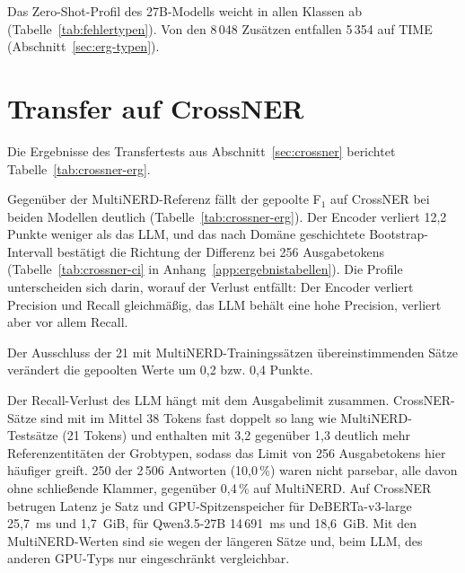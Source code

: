 Das Zero-Shot-Profil des 27B-Modells weicht in allen Klassen ab
(Tabelle~\ref{tab:fehlertypen}).
Von den 8\,048 Zusätzen entfallen 5\,354 auf TIME
(Abschnitt~\ref{sec:erg-typen}).

\section{Transfer auf CrossNER}
\label{sec:erg-crossner}

Die Ergebnisse des Transfertests aus Abschnitt~\ref{sec:crossner}
berichtet Tabelle~\ref{tab:crossner-erg}.

\begin{table}[htbp]
  \centering
  \footnotesize
  \caption[CrossNER-Transfertest (PER, ORG, LOC)]{CrossNER-Transfertest (nur PER, ORG, LOC; strikte Werte in
  Punkten; Precision und Recall als Mittel, F$_1$ als
  Mittelwert~$\pm$~Standardabweichung über die drei
  MultiNERD-Checkpoints je Modell).
  Gepoolt: Mikrowert über alle 2\,506 Sätze; Domänenmittel: ungewichtetes
  Mittel der fünf Domänen-F$_1$.
  MultiNERD-Referenz: dieselben Checkpoints auf dem MultiNERD-Testsplit,
  ebenfalls auf PER, ORG und LOC beschränkt; $\Delta$F$_1$ = gepoolter
  CrossNER-Wert minus Referenz.
  Sensitivität: gepoolter Wert ohne die 21 Sätze, die mit
  MultiNERD-Trainingssätzen übereinstimmen.}
  \label{tab:crossner-erg}
  \setlength{\tabcolsep}{3pt}
  
\end{table}

Gegenüber der MultiNERD-Referenz fällt der gepoolte F$_1$ auf CrossNER
bei beiden Modellen deutlich (Tabelle~\ref{tab:crossner-erg}).
Der Encoder verliert 12,2 Punkte weniger als das LLM, und das nach Domäne
geschichtete Bootstrap-Intervall bestätigt die Richtung der Differenz bei
256 Ausgabetokens (Tabelle~\ref{tab:crossner-ci} in
Anhang~\ref{app:ergebnistabellen}).
Die Profile unterscheiden sich darin, worauf der Verlust entfällt: Der Encoder
verliert Precision und Recall gleichmäßig, das LLM behält eine hohe
Precision, verliert aber vor allem Recall.

Der Ausschluss der 21 mit MultiNERD-Trainingssätzen übereinstimmenden
Sätze verändert die gepoolten Werte um 0,2 bzw. 0,4 Punkte.

Der Recall-Verlust des LLM hängt mit dem Ausgabelimit zusammen.
CrossNER-Sätze sind mit im Mittel 38 Tokens fast doppelt so lang wie
MultiNERD-Testsätze (21 Tokens) und enthalten mit 3,2 gegenüber 1,3
deutlich mehr Referenzentitäten der Grobtypen, sodass das Limit von 256
Ausgabetokens hier häufiger greift. 250 der 2\,506 Antworten (10,0\,\%) waren nicht parsebar, alle
davon ohne schließende Klammer, gegenüber 0,4\,\% auf MultiNERD.
Auf CrossNER betrugen Latenz je Satz und GPU-Spitzenspeicher für
DeBERTa-v3-large 25,7~ms und 1,7~GiB, für Qwen3.5-27B 14\,691~ms und
18,6~GiB. Mit den MultiNERD-Werten sind sie wegen der längeren Sätze
und, beim LLM, des anderen GPU-Typs nur eingeschränkt vergleichbar.

